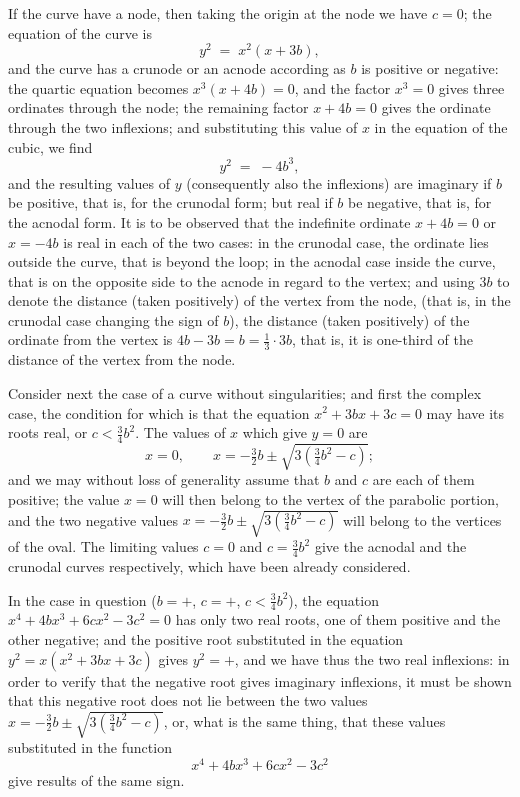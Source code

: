 \documentclass[11pt,a4paper]{article}
\begin{document}
If the curve have a node, then taking the origin at the node we have $c = 0$; the equation of the curve is
\[
y^2 \;=\; x^2(x + 3b),
\]
and the curve has a crunode or an acnode according as $b$ is positive or negative: the quartic equation becomes $x^3(x + 4b) = 0$, and the factor $x^3 = 0$ gives three ordinates through the node; the remaining factor $x + 4b = 0$ gives the ordinate through the two inflexions; and substituting this value of $x$ in the equation of the cubic, we find
\[
y^2 \;=\; -4b^3,
\]
and the resulting values of $y$ (consequently also the inflexions) are imaginary if $b$ be positive, that is, for the crunodal form; but real if $b$ be negative, that is, for the acnodal form. It is to be observed that the indefinite ordinate $x + 4b = 0$ or $x = -4b$ is real in each of the two cases: in the crunodal case, the ordinate lies outside the curve, that is beyond the loop; in the acnodal case inside the curve, that is on the opposite side to the acnode in regard to the vertex; and using $3b$ to denote the distance (taken positively) of the vertex from the node, (that is, in the crunodal case changing the sign of $b$), the distance (taken positively) of the ordinate from the vertex is $4b - 3b = b = \tfrac{1}{3}\cdot 3b$, that is, it is one-third of the distance of the vertex from the node.

\medskip

Consider next the case of a curve without singularities; and first the complex case, the condition for which is that the equation $x^2 + 3bx + 3c = 0$ may have its roots real, or $c < \tfrac{3}{4}b^2$. The values of $x$ which give $y = 0$ are
\[
x = 0,\qquad x = -\tfrac{3}{2}b \pm \sqrt{3(\tfrac{3}{4}b^2 - c)};
\]
and we may without loss of generality assume that $b$ and $c$ are each of them positive; the value $x = 0$ will then belong to the vertex of the parabolic portion, and the two negative values $x = -\tfrac{3}{2}b \pm \sqrt{3(\tfrac{3}{4}b^2 - c)}$ will belong to the vertices of the oval. The limiting values $c = 0$ and $c = \tfrac{3}{4}b^2$ give the acnodal and the crunodal curves respectively, which have been already considered.

\medskip

In the case in question ($b = +$, $c = +$, $c < \tfrac{3}{4} b^2$), the equation $x^4 + 4bx^3 + 6cx^2 - 3c^2 = 0$ has only two real roots, one of them positive and the other negative; and the positive root substituted in the equation $y^2 = x(x^2 + 3bx + 3c)$ gives $y^2 = +$, and we have thus the two real inflexions: in order to verify that the negative root gives imaginary inflexions, it must be shown that this negative root does not lie between the two values $x = -\tfrac{3}{2}b \pm \sqrt{3(\tfrac{3}{4}b^2 - c)}$, or, what is the same thing, that these values substituted in the function
\[
x^4 + 4bx^3 + 6cx^2 - 3c^2
\]
give results of the same sign.
\end{document}
